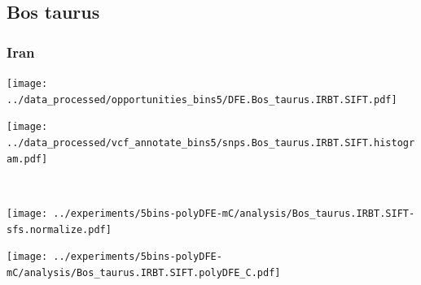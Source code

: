 \subsection{Bos taurus}

\subsubsection{Iran}

\begin{minipage}{0.49\linewidth}
    \texttt{[image: ../data\_processed/opportunities\_bins5/DFE.Bos\_taurus.IRBT.SIFT.pdf]}
\end{minipage}
\begin{minipage}{0.49\linewidth}
    \texttt{[image: ../data\_processed/vcf\_annotate\_bins5/snps.Bos\_taurus.IRBT.SIFT.histogram.pdf]}
\end{minipage}
\\
\begin{minipage}{0.49\linewidth}
    \texttt{[image: ../experiments/5bins-polyDFE-mC/analysis/Bos\_taurus.IRBT.SIFT-sfs.normalize.pdf]}
\end{minipage}
\begin{minipage}{0.4\linewidth}
    \texttt{[image: ../experiments/5bins-polyDFE-mC/analysis/Bos\_taurus.IRBT.SIFT.polyDFE\_C.pdf]}
\end{minipage}
